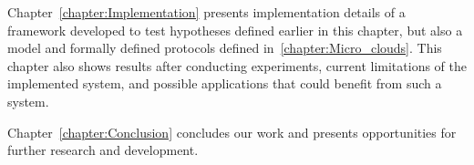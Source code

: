 Chapter~\ref{chapter:Implementation} presents implementation details of a framework developed to test hypotheses defined earlier in this chapter, but also a model and formally defined protocols defined in~\ref{chapter:Micro_clouds}. This chapter also shows results after conducting experiments, current limitations of the implemented system, and possible applications that could benefit from such a system.

Chapter~\ref{chapter:Conclusion} concludes our work and presents opportunities for further research and development.
%
%